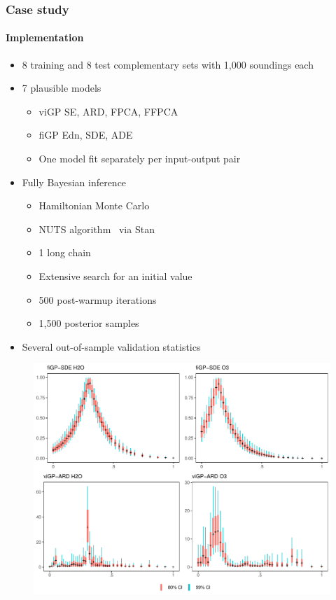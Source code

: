 \documentclass{snedecorbeamer}
\begin{document}
\begin{frame}
  \frametitle{Case study}
  \framesubtitle{Implementation}

  \begin{itemize}
  \item 8 training and 8 test complementary sets with 1,000 soundings each
  \item 7 plausible models
    \begin{itemize}
    \item viGP SE, ARD, FPCA, FFPCA
    \item fiGP Edn, SDE, ADE
    \item One model fit separately per input-output pair
    \end{itemize}
  \item Fully Bayesian inference
    \begin{itemize}
    \item Hamiltonian Monte Carlo~\citep[ch. 5]{brooks2011}
    \item NUTS algorithm~\citep{hoffman2014} via Stan~\citep{standevelopmentteam2021}
    \item 1 long chain~\citep{raftery1992}
    \item Extensive search for an initial value
    \item 500 post-warmup iterations
    \item 1,500 posterior samples
    \end{itemize}
  \item Several out-of-sample validation statistics
    \hyperlink{frm:validation}{}
  \end{itemize}
\end{frame}

\begin{frame}[c]
  \begin{figure}
    \centering
    \includegraphics[height=.95\textheight]{weights-examples-pressure.pdf}
  \end{figure}

\end{frame}
\end{document}
